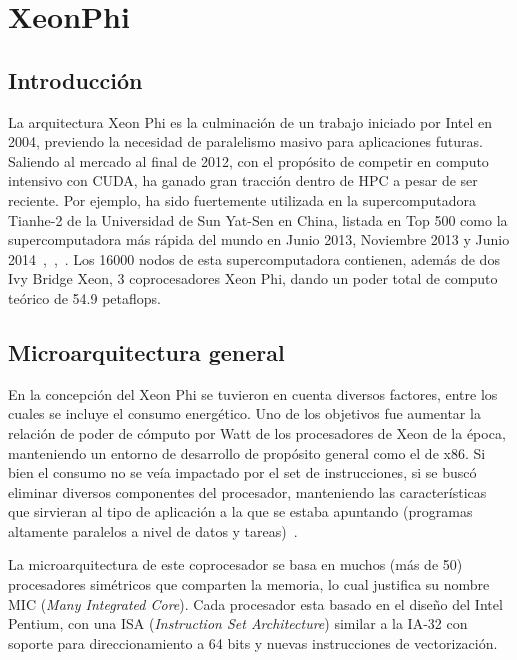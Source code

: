 
\section{XeonPhi}

\subsection{Introducci\'on}

La arquitectura Xeon Phi es la culminaci\'on de un trabajo iniciado por Intel en 2004, previendo
la necesidad de paralelismo masivo para aplicaciones futuras. Saliendo al mercado al final de 2012,
con el prop\'osito de competir en computo intensivo con \nvidia CUDA, ha ganado gran tracci\'on dentro
de HPC a pesar de ser reciente. Por ejemplo, ha sido fuertemente utilizada en la supercomputadora Tianhe-2
de la Universidad de Sun Yat-Sen en China, listada en Top 500 como la supercomputadora m\'as r\'apida del
mundo en Junio 2013, Noviembre 2013 y Junio 2014~\cite{Top500XeonPhiJune2013},~\cite{Top500XeonPhiNov2013},~\cite{Top500XeonPhiJune2014}.
Los 16000 nodos de esta supercomputadora contienen, adem\'as de dos Ivy Bridge Xeon, 3 coprocesadores
Xeon Phi, dando un poder total de computo te\'orico de 54.9 petaflops.

\subsection{Microarquitectura general}

En la concepci\'on del Xeon Phi se tuvieron en cuenta diversos factores, entre los cuales
se incluye el consumo energ\'etico. Uno de los objetivos fue aumentar la relaci\'on de
poder de c\'omputo por Watt de los procesadores de Xeon de la \'epoca, manteniendo un entorno
de desarrollo de prop\'osito general como el de x86.
Si bien el consumo no se ve\'ia impactado por el set de instrucciones,
si se busc\'o eliminar diversos componentes del procesador, manteniendo las caracter\'isticas
que sirvieran al tipo de aplicaci\'on a la que se estaba
apuntando (programas altamente paralelos a nivel de datos y tareas)~\cite{BookXeonPhi}.

La microarquitectura de este coprocesador se basa en muchos (m\'as de 50) procesadores sim\'etricos que comparten la memoria, lo
cual justifica su nombre MIC (\textit{Many Integrated Core}). Cada procesador esta basado
en el dise\~no del Intel Pentium, con una ISA (\textit{Instruction Set Architecture}) similar a la IA-32 con
soporte para direccionamiento a 64 bits y nuevas instrucciones de vectorizaci\'on.

